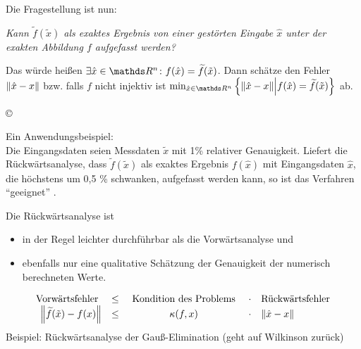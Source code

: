 
Die Fragestellung ist nun:

\textit{Kann $\widetilde{f}(\tilde{x})$ als exaktes Ergebnis
  von einer gestörten Eingabe $\hat{x}$ 
  unter der exakten Abbildung $f$ aufgefasst werden?}

Das würde heißen
$\exists\hat{x}\in\Ren\colon f(\hat{x})=\widetilde{f}(\tilde{x})$.
Dann schätze den Fehler $ \nn[\hat{x}-x]$
bzw. falls $f$ nicht injektiv ist
$\min_{\hat{x}\in \Ren}
\left\{ \nn[\hat{x}-x]\middle\vert 
  f(\hat{x}) = \widetilde{f}(\tilde{x}) 
  \right\}$ ab. 

\begin{image}{\copyright}
\end{image}

Ein Anwendungsbeispiel:\\
Die Eingangsdaten seien Messdaten $\tilde{x}$  mit 1\% relativer Genauigkeit. 
Liefert die Rückwärtsanalyse, dass $\widetilde{f} (\tilde{x})$ als exaktes Ergebnis 
$f(\hat x)$ mit Eingangsdaten $\hat x$, 
die höchstens um 0,5 \% schwanken, aufgefasst werden kann,
so ist das Verfahren \enquote{geeignet} . 

Die Rückwärtsanalyse ist
\begin{itemize}
\item in der Regel leichter durchführbar als die
  Vorwärtsanalyse  und 
\item ebenfalls nur eine qualitative Schätzung der
  Genauigkeit der numerisch berechneten Werte.
\end{itemize}

\begin{Beme}
  \begin{gather*}
    \begin{array}{rcccl}
      \text{Vorwärtsfehler } &\leq& \text{ Kondition des Problems }
      &\cdot&\text{Rückwärtsfehler} \\  
      \nn[\widetilde{f}(\tilde{x})-f(x)]&\leq &\kappa(f,x)&\cdot&\nn[\hat{x}-x]
    \end{array}
  \end{gather*}
  Beispiel: Rückwärtsanalyse der Gauß-Elimination
  (geht auf Wilkinson zurück)
\end{Beme}


